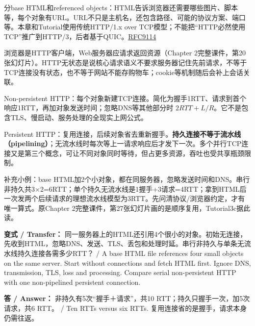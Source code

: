 

分base HTML和referenced objects：HTML告诉浏览器还需要哪些图片、脚本等，每个对象有URL。URL不只是主机名，还包含路径、可能的协议方案、端口等。本章和Tutorial使用传统HTTP/1.x over TCP模型；不能把“HTTP必然使用TCP”推广到HTTP/3，后者基于QUIC。\href{https://www.rfc-editor.org/rfc/rfc9114}{RFC9114}


浏览器是HTTP客户端，Web服务器应请求返回资源（Chapter 2完整课件，第20张幻灯片）。HTTP无状态是说核心请求语义不要求服务器记住先前请求，不等于TCP连接没有状态，也不等于网站不能存购物车；cookie等机制随后会补上会话关联。





Non-persistent HTTP：每个对象新建TCP连接。简化为握手1RTT、请求到首个响应1RTT，再加对象发送时间；忽略DNS等其他部分时 \(2RTT+L/R\)。它不是包含TLS、慢启动、服务处理的全现实上网公式。




Persistent HTTP：复用连接，后续对象省去重新握手。\textbf{持久连接不等于流水线（pipelining）}；无流水线时每次等上一请求响应后才发下一次。多个并行TCP连接又是第三个概念，可让不同对象同时等待，但占更多资源，吞吐也受共享瓶颈限制。


补充小例：base HTML加2个小对象，都在同服务器，忽略发送时间和DNS。串行非持久共3\ensuremath{\times}2=6RTT；单个持久无流水线是1握手+3请求=4RTT；拿到HTML后一次发两个后续请求的理想流水线模型为3RTT。先问清协议/浏览器约定，才有唯一算式。原Chapter 2完整课件，第27张幻灯片画的是顺序复用，Tutorial3c据此读。


\textbf{变式 / Transfer：} 同一服务器上的HTML还引用4个很小的对象。初始无连接，先收到HTML，忽略DNS、发送、TLS、丢包和处理时延。串行非持久与单条无流水线持久连接各需多少RTT？ / A base HTML file references four small objects on the same server. Start without connections and fetch HTML first. Ignore DNS, transmission, TLS, loss and processing. Compare serial non-persistent HTTP with one non-pipelined persistent connection.


\textbf{答 / Answer：} 非持久有5次“握手＋请求”，共10 RTT；持久只握手一次，加5次请求，共6 RTT。 / Ten RTTs versus six RTTs. 复用连接省的是握手，请求本身仍需往返。



